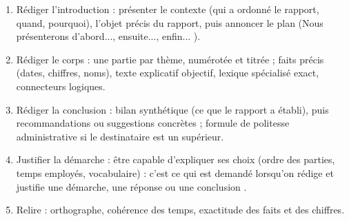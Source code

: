 \documentclass[11pt]{article}
\newcommand{\cle}[1]{{\popxbold\color{popdark}#1}}
\begin{document}
\begin{methode}
\begin{enumerate}
\item \cle{Rédiger l'introduction} : présenter le contexte (qui a ordonné le rapport, quand, pourquoi), l'objet précis du rapport, puis annoncer le plan (\og Nous présenterons d'abord..., ensuite..., enfin... \fg{}).
\item \cle{Rédiger le corps} : une partie par thème, numérotée et titrée ; faits précis (dates, chiffres, noms), texte explicatif objectif, lexique spécialisé exact, connecteurs logiques.
\item \cle{Rédiger la conclusion} : bilan synthétique (ce que le rapport a établi), puis recommandations ou suggestions concrètes ; formule de politesse administrative si le destinataire est un supérieur.
\item \cle{Justifier la démarche} : être capable d'expliquer ses choix (ordre des parties, temps employés, vocabulaire) : c'est ce qui est demandé lorsqu'on \og rédige et justifie une démarche, une réponse ou une conclusion \fg{}.
\item \cle{Relire} : orthographe, cohérence des temps, exactitude des faits et des chiffres.
\end{enumerate}
\end{methode}
\end{document}
